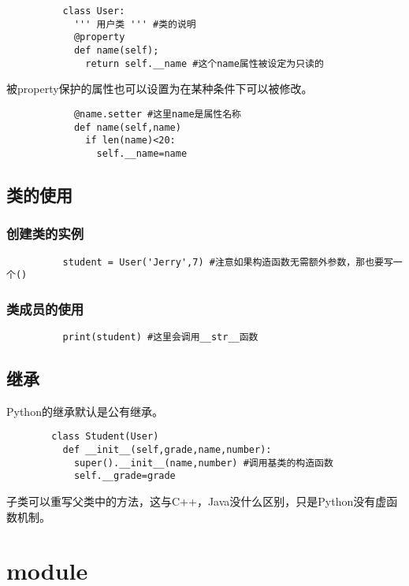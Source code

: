 \documentclass{article}
\begin{document}
        \begin{lstlisting}
          class User: 
            ''' 用户类 ''' #类的说明
            @property
            def name(self);
              return self.__name #这个name属性被设定为只读的
        \end{lstlisting}

        被property保护的属性也可以设置为在某种条件下可以被修改。
        \begin{lstlisting}
            @name.setter #这里name是属性名称
            def name(self,name)
              if len(name)<20:
                self.__name=name
        \end{lstlisting}
          
    \subsection{类的使用}
      \subsubsection{创建类的实例}
        \begin{lstlisting}
          student = User('Jerry',7) #注意如果构造函数无需额外参数，那也要写一个()
        \end{lstlisting}

      \subsubsection{类成员的使用}
        \begin{lstlisting}
          print(student) #这里会调用__str__函数
        \end{lstlisting}

    \subsection{继承}
      Python的继承默认是公有继承。
      \begin{lstlisting}
        class Student(User)
          def __init__(self,grade,name,number):
            super().__init__(name,number) #调用基类的构造函数
            self.__grade=grade
      \end{lstlisting}

      子类可以重写父类中的方法，这与C++，Java没什么区别，只是Python没有虚函数机制。

  \section{module}
\end{document}

